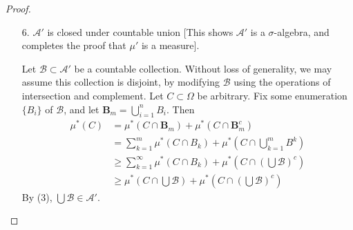 \begin{proof}
    \begin{enumerate}
        \item[6.]  $\mathcal{A}'$ is closed under countable union [This shows $\mathcal{A}'$ is a $\sigma$-algebra, and completes the proof that $\mu'$ is a measure].
        \begin{proof*}
            Let $\mathcal{B} \subset \mathcal{A}'$ be a countable collection. Without loss of generality, we may assume this collection is disjoint, by modifying $\mathcal{B}$ using the operations of intersection and complement. Let $C \subset \Omega$ be arbitrary. Fix some enumeration $\{ B_i \}$ of $\mathcal{B}$, and let $\mathbf{B}_m = \bigcup_{i = 1}^n B_i$. Then
            \begin{align*}
                \mu^*(C) &= \mu^*(C \cap \mathbf{B}_m) + \mu^*(C \cap \mathbf{B}_m^c)\\
                &= \sum_{k = 1}^m \mu^*(C \cap B_k) + \mu^*\left(C \cap \bigcup_{k = 1}^m B^k \right)\\
                &\geq \sum_{k = 1}^\infty \mu^*(C \cap B_k) + \mu^*\left(C \cap \left(\bigcup \mathcal{B}\right)^c\right)\\
                &\geq \mu^*\left(C \cap \bigcup \mathcal{B}\right) + \mu^*\left(C \cap \left(\bigcup \mathcal{B}\right)^c\right)
            \end{align*}
            By (3), $\bigcup \mathcal{B} \in \mathcal{A}'$.
        \end{proof*}


\end{enumerate}
\end{proof}
